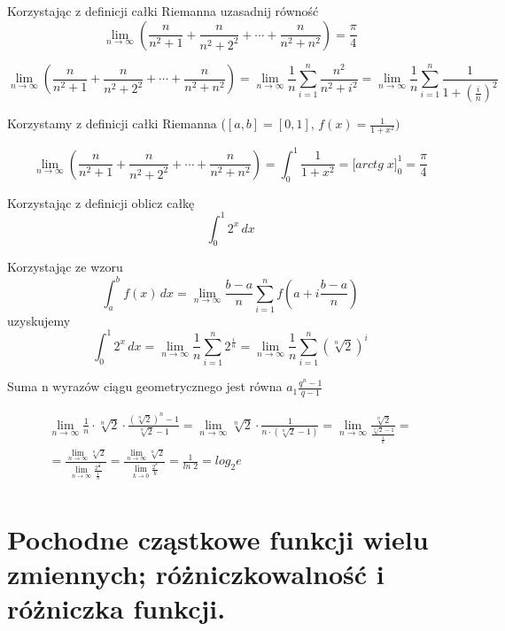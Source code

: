 \documentclass[12pt]{article}
\begin{document}
    \begin{exercise}
        Korzystając z definicji całki Riemanna uzasadnij równość \[\lim_{n \rightarrow \infty} (\frac{n}{n^2 + 1} + \frac{n}{n^2 + 2^2} + \cdots + \frac{n}{n^2 + n^2}) = \frac{\pi}{4}\]
    \end{exercise}

    \[\lim_{n \rightarrow \infty} (\frac{n}{n^2 + 1} + \frac{n}{n^2 + 2^2} + \cdots + \frac{n}{n^2 + n^2}) =
    \lim_{n \rightarrow \infty} \frac{1}{n} \sum_{i =1}^{n} \frac{n^2}{n^2 + i^2} = \lim_{n \rightarrow \infty} \frac{1}{n} \sum_{i =1}^{n} \frac{1}{1 + (\frac{i}{n})^2} \]

    Korzystamy z definicji całki Riemanna ($[a, b] = [0, 1]$, $f(x) = \frac{1}{1 + x^2})$

    \[\lim_{n \rightarrow \infty} (\frac{n}{n^2 + 1} + \frac{n}{n^2 + 2^2} + \cdots + \frac{n}{n^2 + n^2}) = \int_0^1 \frac{1}{1 + x^2}= \big[arctg \; x \big]^1_0 = \frac{\pi}{4}\]

    \begin{exercise}
        Korzystając z definicji oblicz całkę
        \[\int_0^1 2^x \,dx\]
    \end{exercise}

    Korzystając ze wzoru
    \[\int_a^b f(x) \,dx = \lim_{n \rightarrow \infty} \frac{b - a}{n} \sum_{i =1}^{n} f(a + i\frac{b - a}{n}) \]
    uzyskujemy
    \[\int_0^1 2^x \,dx = \lim_{n \rightarrow \infty} \frac{1}{n} \sum_{i =1}^{n} 2^{\frac{i}{n}}
    = \lim_{n \rightarrow \infty} \frac{1}{n} \sum_{i =1}^{n} (\sqrt[n]{2})^i \]

    Suma n wyrazów ciągu geometrycznego jest równa $a_1 \frac{q^n - 1}{q - 1}$

    \begin{gather*}
        \lim_{n \rightarrow \infty} \frac{1}{n} \cdot \sqrt[n]{2} \cdot \frac{(\sqrt[n]{2})^n - 1}{\sqrt[n]{2} - 1} =
        \lim_{n \rightarrow \infty} \sqrt[n]{2} \cdot \frac{1}{n \cdot (\sqrt[n]{2} - 1)} =
        \lim_{n \rightarrow \infty} \frac{\sqrt[n]{2}}{\frac{\sqrt[n]{2} - 1}{\frac{1}{n}}} =\\
        = \frac{\lim_{n \rightarrow \infty} \sqrt[n]{2}}{\lim_{n \rightarrow \infty} \frac{2^{\frac{1}{n}}}{\frac{1}{n}}} =
        \frac{\lim_{n \rightarrow \infty} \sqrt[n]{2}}{\lim_{k \rightarrow 0} \frac{2^{k}}{k}} =
        \frac{1}{ln\; 2} = log_2e\\
    \end{gather*}
    \newpage

    \section{Pochodne cząstkowe funkcji wielu zmiennych; różniczkowalność i różniczka funkcji.}
\end{document}
